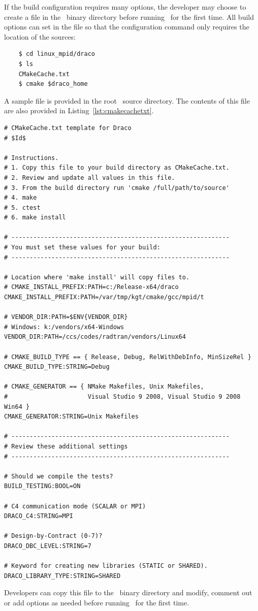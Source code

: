 If the build configuration requires many options, the developer may choose to create a  file in the \draco\ binary directory before running \cmake\ for the first time.  All build options can set in the  file so that the configuration command only requires the location of the sources:
\begin{verbatim}
    $ cd linux_mpid/draco
    $ ls
    CMakeCache.txt
    $ cmake $draco_home
\end{verbatim}
A sample  file is provided in the root \draco\ source directory.  The contents of this file are also provided in Listing~\ref{lst:cmakecachetxt}.
%
\begin{lstlisting}[basicstyle=\footnotesize, xleftmargin=0.0in, xrightmargin=0.0in, caption={A sample \comp{CMakeCache.txt} file.}, float=tn,label={lst:cmakecachetxt}]
# CMakeCache.txt template for Draco
# $Id$

# Instructions.
# 1. Copy this file to your build directory as CMakeCache.txt.
# 2. Review and update all values in this file.
# 3. From the build directory run 'cmake /full/path/to/source'
# 4. make
# 5. ctest
# 6. make install

# ------------------------------------------------------------
# You must set these values for your build:
# ------------------------------------------------------------

# Location where 'make install' will copy files to.
# CMAKE_INSTALL_PREFIX:PATH=c:/Release-x64/draco
CMAKE_INSTALL_PREFIX:PATH=/var/tmp/kgt/cmake/gcc/mpid/t

# VENDOR_DIR:PATH=$ENV{VENDOR_DIR}
# Windows: k:/vendors/x64-Windows
VENDOR_DIR:PATH=/ccs/codes/radtran/vendors/Linux64

# CMAKE_BUILD_TYPE == { Release, Debug, RelWithDebInfo, MinSizeRel }
CMAKE_BUILD_TYPE:STRING=Debug

# CMAKE_GENERATOR == { NMake Makefiles, Unix Makefiles, 
#                      Visual Studio 9 2008, Visual Studio 9 2008 Win64 }
CMAKE_GENERATOR:STRING=Unix Makefiles

# ------------------------------------------------------------
# Review these additional settings
# ------------------------------------------------------------

# Should we compile the tests?
BUILD_TESTING:BOOL=ON

# C4 communication mode (SCALAR or MPI)
DRACO_C4:STRING=MPI

# Design-by-Contract (0-7)?
DRACO_DBC_LEVEL:STRING=7
 
# Keyword for creating new libraries (STATIC or SHARED).
DRACO_LIBRARY_TYPE:STRING=SHARED
\end{lstlisting}
Developers can copy this file to the \draco\ binary directory and modify, comment out or add options as needed before running \cmake\ for the first time.

